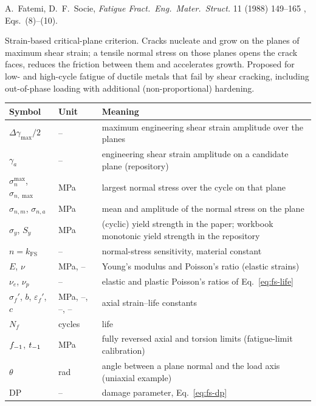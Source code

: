 \label{sheet:FS}

 A.~Fatemi, D.~F.~Socie, \emph{Fatigue Fract.\ Eng.\ Mater.\ Struct.} 11 (1988)
149--165 \cite{fatemi1988}, Eqs.~(8)--(10).

 Strain-based critical-plane criterion. Cracks nucleate and grow on the
planes of maximum shear strain; a tensile normal stress on those planes opens the crack faces,
reduces the friction between them and accelerates growth. Proposed for low- and high-cycle fatigue
of ductile metals that fail by shear cracking, including out-of-phase loading with additional
(non-proportional) hardening.

\begin{center}\small
\begin{tabular}{@{}llp{100mm}@{}}
\toprule
Symbol & Unit & Meaning\\\midrule
$\Delta\gamma_{\max}/2$ & -- & maximum engineering shear strain amplitude over the planes\\
$\gamma_a$ & -- & engineering shear strain amplitude on a candidate plane (repository)\\
$\sigma_n^{\max}$, $\sigma_{n,\max}$ & MPa & largest normal stress over the cycle on that plane\\
$\sigma_{n,m}$, $\sigma_{n,a}$ & MPa & mean and amplitude of the normal stress on the plane\\
$\sigma_y$, $S_y$ & MPa & (cyclic) yield strength in the paper; workbook monotonic yield strength in the repository\\
$n=k_\mathrm{FS}$ & -- & normal-stress sensitivity, material constant\\
$E$, $\nu$ & MPa, -- & Young's modulus and Poisson's ratio (elastic strains)\\
$\nu_e$, $\nu_p$ & -- & elastic and plastic Poisson's ratios of Eq.~\eqref{eq:fs-life}\\
$\sigma_f'$, $b$, $\varepsilon_f'$, $c$ & MPa, --, --, -- & axial strain--life constants\\
$N_f$ & cycles & life\\
$f_{-1}$, $t_{-1}$ & MPa & fully reversed axial and torsion limits (fatigue-limit calibration)\\
$\theta$ & rad & angle between a plane normal and the load axis (uniaxial example)\\
$\mathrm{DP}$ & -- & damage parameter, Eq.~\eqref{eq:fs-dp}\\
\bottomrule
\end{tabular}
\end{center}

